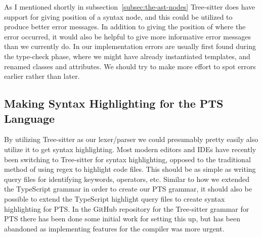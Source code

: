 As I mentioned shortly in subsection~\vref{subsec:the-ast-nodes} Tree-sitter does have support for giving position of a syntax node, and this could be utilized to produce better error messages.
In addition to giving the position of where the error occurred, it would also be helpful to give more informative error messages than we currently do.
In our implementation errors are usually first found during the type-check phase, where we might have already instantiated templates, and renamed classes and attributes.
We should try to make more effort to spot errors earlier rather than later.

\subsection{Making Syntax Highlighting for the PTS Language}\label{subsec:making-syntax-highligthing-for-the-pts-language}

By utilizing Tree-sitter as our lexer/parser we could presumably pretty easily also utilize it to get syntax highlighting.
Most modern editors and IDEs have recently been switching to Tree-sitter for syntax highlighting, opposed to the traditional method of using regex to highlight code files.
This should be as simple as writing query files for identifying keywords, operators, etc.
Similar to how we extended the TypeScript grammar in order to create our PTS grammar, it should also be possible to extend the TypeScript highlight query files to create syntax highlighting for PTS\@.
In the GitHub repository for the Tree-sitter grammar for PTS there has been done some initial work for setting this up, but has been abandoned as implementing features for the compiler was more urgent.
